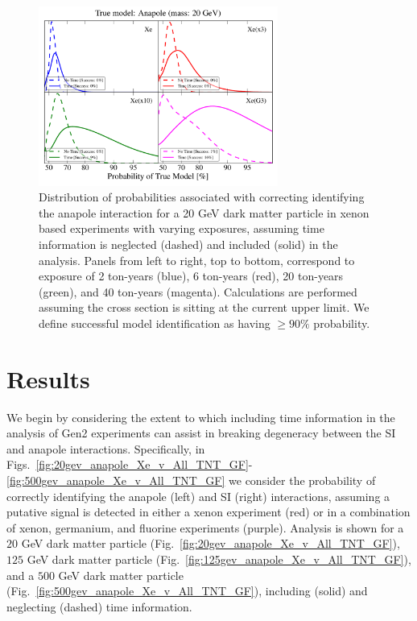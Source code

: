 \documentclass[11pt]{article}
\newcommand{\Fig}[1]{Fig.~\ref{#1}} \newcommand{\Figs}[2]{Figs.~\ref{#1} and \ref{#2}}
\begin{document}
\begin{figure}
\centering
\includegraphics[width=0.7\textwidth]{plots/PDF_20GeV_Anapole_50sims_Xe_Xe3x_Xe10x_XeG3_GF_TNT.pdf}
\caption{\label{fig:20gev_anapole_XeFull_TNT_GF}
Distribution of probabilities associated with correcting identifying the anapole interaction for a 20 GeV dark matter particle in xenon based experiments with varying exposures, assuming time information is neglected (dashed) and included (solid) in the analysis. Panels from left to right, top to bottom, correspond to exposure of 2 ton-years (blue), 6 ton-years (red), 20 ton-years (green), and 40 ton-years (magenta). Calculations are performed assuming the cross section is sitting at the current upper limit. We define successful model identification as having $\geq 90 \%$ probability.}
\end{figure}




\section{Results}\label{sec:results}
We begin by considering the extent to which including time information in the analysis of Gen2 experiments can assist in breaking degeneracy between the SI and anapole interactions. Specifically, in Figs.~\ref{fig:20gev_anapole_Xe_v_All_TNT_GF}-\ref{fig:500gev_anapole_Xe_v_All_TNT_GF} we consider the probability of correctly identifying the anapole (left) and SI (right) interactions, assuming a putative signal is detected in either a xenon experiment (red) or in a combination of xenon, germanium, and fluorine experiments (purple). Analysis is shown for a $20$ GeV dark matter particle (\Fig{fig:20gev_anapole_Xe_v_All_TNT_GF}), $125$ GeV dark matter particle (\Fig{fig:125gev_anapole_Xe_v_All_TNT_GF}), and a $500$ GeV dark matter particle (\Fig{fig:500gev_anapole_Xe_v_All_TNT_GF}), including (solid) and neglecting (dashed) time information. 
\end{document}
